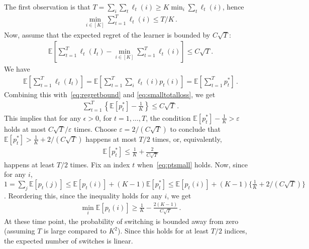 \documentclass{article} %
\newcommand{\EE}[1]{\mathbb{E}\left[ #1 \right]}
\newcommand{\eps}{\varepsilon}
\theoremstyle{plain}
\theoremstyle{definition}
\theoremstyle{remark}
\begin{document}
The first observation is that $T = \sum_i \sum_t \ell_t(i) \ge K\min_i \sum_t \ell_t(i)$, hence 
\begin{align}
\label{eq:smalltotalloss}
\min_{i\in [K]} \sum_{t=1}^T \ell_t(i) \le T/K\,.
\end{align}
Now, assume that the expected regret of the learner is bounded by $C \sqrt{T}$:
\begin{align}
\label{eq:regretbound}
\EE{ \sum_{t=1}^T \ell_t(I_t)  - \min_{i\in [K]} \sum_{t=1}^T \ell_t(i) } \le C \sqrt{T}.
\end{align}
We have
\begin{align*}
\EE{ \sum_{t=1}^T \ell_t(I_t) } = \EE{ \sum_{t=1}^T \sum_i \ell_t(i) p_t(i) } = \EE{ \sum_{t=1}^T p_t^* }\,.
\end{align*}
Combining this with~\eqref{eq:regretbound} and \eqref{eq:smalltotalloss}, we get
\begin{align*}
\sum_{t=1}^T \left\{\EE{p_t^*} - \frac{1}{K}\right\}  \le C \sqrt{T}\,.
\end{align*}
This implies that for any $\epsilon>0$, for $t=1,\dots,T$, 
the condition $\EE{p_t^*} - \frac{1}{K}>\eps$ holds at most $C \sqrt{T}/\eps$ times.
Choose $\eps = 2/(C \sqrt{T})$ to conclude that
$\EE{p_t^*} > \frac{1}{K} + 2/(C \sqrt{T})$ happens at most $T/2$ times, or, equivalently,
\begin{align}
\EE{p_t^*} \le \frac{1}{K} + \frac{2}{C \sqrt{T}}
\label{eq:ptsmall}
\end{align}
happens at least $T/2$ times.
Fix an index $t$ when~\eqref{eq:ptsmall} holds.
Now, since for any $i$,
$1 = \sum_j \EE{p_t(j)} \le \EE{p_t(i)} + (K-1) \EE{p_t^*} \le \EE{p_t(i)} + (K-1) \{\frac{1}{K} + 2/(C \sqrt{T})\}$.
Reordering this, since the inequality holds for any $i$, we get
\begin{align*}
\min_i \EE{p_t(i)} \ge \frac{1}{K} - \frac{2(K-1)}{C \sqrt{T}}\,.
\end{align*}
At these time point, the probability of switching is bounded away from zero (assuming $T$ is large compared to $K^2$).
Since this holds for at least $T/2$ indices, the expected number of switches is linear.

\renewcommand{\bibsection}{\subsubsection*{\refname}}


\end{document}
